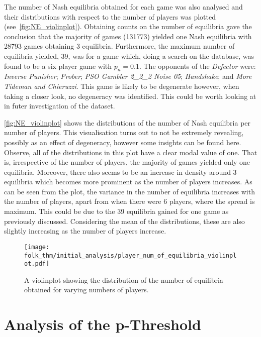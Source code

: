 The number of Nash equilibria obtained for each game was also analysed and
their distributions with respect to the number of players was plotted
(see~\autoref{fig:NE_violinplot}). Obtaining counts on the number of equilibria gave the conclusion that the
majority of games
(131773) yielded one Nash equilibria with 28793 games obtaining 3 equilibria.
Furthermore, the maximum number of equilibria yielded, 39, was for a game which,
doing a search on the database, was found to be a six player game with
\(p_{n}=0.1\). The opponents of the \textit{Defector} were: \textit{Inverse
Punisher}; \textit{Prober}; \textit{PSO Gambler 2\_2\_2 Noise 05};
\textit{Handshake}; and \textit{More Tideman and Chieruzzi}. This game is likely to be degenerate however, when taking a closer look, no degeneracy was identified. This could be worth looking at in
futer investigation of the dataset. 

\autoref{fig:NE_violinplot} shows the distributions of the number of Nash
equilibria per number of players. This visualisation turns out to not be
extremely revealing, possibly as an effect of degeneracy, however some
insights can be found here. Observe, all of the distributions in this plot have a clear modal value of one. That is, irrespective of
the number of players, the majority of games yielded only one equilibria.
Moreover, there also seems to be an increase in density around 3 equilibria
which becomes more prominent as the number of players increases. As can
be seen from the plot, the variance in the number of equilibria increases with
the number of players, apart from when there were 6 players, where the spread is maximum. This could be due to the 39 equilibria
gained for one game as previously discussed. Considering the mean
of the distributions, these are also slightly increasing as the
number of players increase. 

\begin{figure}      
    \centering
    \texttt{[image: folk\_thm/initial\_analysis/player\_num\_of\_equilibria\_violinplot.pdf]}
    \caption{A violinplot showing the distribution of the number of equilibria obtained for varying numbers of players.}\label{fig:NE_violinplot}
\end{figure}



\section{Analysis of the p-Threshold}\label{sec:Analysis_of_the_p-Threshold}

